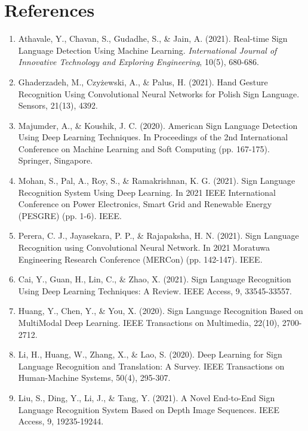 \chapter{References} 

\begin{enumerate}
\item Athavale, Y., Chavan, S., Gudadhe, S., & Jain, A. (2021). Real-time Sign Language
    Detection Using Machine Learning. \textit{International Journal of Innovative Technology
    and Exploring Engineering}, 10(5), 680-686.

    \item  Ghaderzadeh, M., Czyżewski, A., & Palus, H. (2021). Hand Gesture Recognition Using
Convolutional Neural Networks for Polish Sign Language. Sensors, 21(13), 4392.

    \item  Majumder, A., & Koushik, J. C. (2020). American Sign Language Detection Using
Deep Learning Techniques. In Proceedings of the 2nd International Conference on
Machine Learning and Soft Computing (pp. 167-175). Springer, Singapore.

    \item  Mohan, S., Pal, A., Roy, S., & Ramakrishnan, K. G. (2021). Sign Language Recognition
System Using Deep Learning. In 2021 IEEE International Conference on Power
Electronics, Smart Grid and Renewable Energy (PESGRE) (pp. 1-6). IEEE.

    \item  Perera, C. J., Jayasekara, P. P., & Rajapaksha, H. N. (2021). Sign Language Recognition
using Convolutional Neural Network. In 2021 Moratuwa Engineering Research
Conference (MERCon) (pp. 142-147). IEEE.

    \item  Cai, Y., Guan, H., Lin, C., & Zhao, X. (2021). Sign Language Recognition Using Deep
Learning Techniques: A Review. IEEE Access, 9, 33545-33557.

    \item  Huang, Y., Chen, Y., & You, X. (2020). Sign Language Recognition Based on MultiModal Deep Learning. IEEE Transactions on Multimedia, 22(10), 2700-2712.


    \item  Li, H., Huang, W., Zhang, X., & Lao, S. (2020). Deep Learning for Sign Language
Recognition and Translation: A Survey. IEEE Transactions on Human-Machine
Systems, 50(4), 295-307.

    \item  Liu, S., Ding, Y., Li, J., & Tang, Y. (2021). A Novel End-to-End Sign Language
Recognition System Based on Depth Image Sequences. IEEE Access, 9, 19235-19244.


\end{enumerate}
